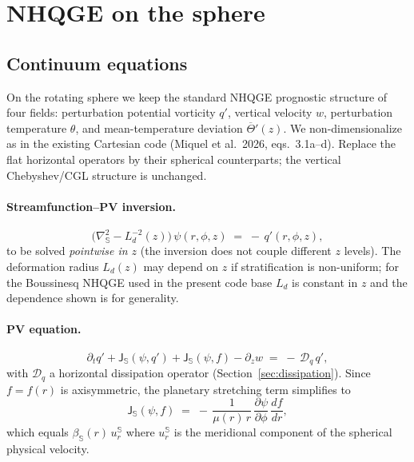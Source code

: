 \documentclass[11pt]{article}
\newcommand{\Lapsphere}{\nabla^2_{\!\mathbb{S}}}
\newcommand{\Jsphere}{\mathsf{J}_{\mathbb{S}}}
\newcommand{\Ld}{L_d}
\begin{document}
\section{NHQGE on the sphere}
\label{sec:nhqge}

\subsection{Continuum equations}

On the rotating sphere we keep the standard NHQGE prognostic structure
of four fields: perturbation potential vorticity $q'$, vertical
velocity $w$, perturbation temperature $\theta$, and mean-temperature
deviation $\overline{\Theta}'(z)$.  We non-dimensionalize as in the
existing Cartesian code (Miquel et al.~2026, eqs.~3.1a--d).  Replace
the flat horizontal operators by their spherical counterparts; the
vertical Chebyshev/CGL structure is unchanged.

\paragraph{Streamfunction--PV inversion.}
\begin{equation}
  \boxed{\;\;
  \bigl(\Lapsphere - \Ld^{-2}(z)\bigr)\,\psi(r,\phi,z)
  \;=\; -\,q'(r,\phi,z),
  \;\;}
  \label{eq:psi-q}
\end{equation}
to be solved \emph{pointwise in $z$} (the inversion does not couple
different $z$ levels).  The deformation radius $\Ld(z)$ may depend on
$z$ if stratification is non-uniform; for the Boussinesq NHQGE used
in the present code base $\Ld$ is constant in $z$ and the dependence
shown is for generality.

\paragraph{PV equation.}
\begin{equation}
  \partial_{t} q' + \Jsphere(\psi, q')
  + \Jsphere(\psi, f)
  - \partial_{z} w
  \;=\; -\,\mathcal{D}_{q}\,q',
  \label{eq:q-eq}
\end{equation}
with $\mathcal{D}_{q}$ a horizontal dissipation operator
(Section~\ref{sec:dissipation}).  Since $f = f(r)$ is axisymmetric, the
planetary stretching term simplifies to
\begin{equation}
  \Jsphere(\psi, f) \;=\; -\,\frac{1}{\mu(r)\,r}\,
  \frac{\partial \psi}{\partial \phi}\,\frac{df}{dr},
  \label{eq:Jpsi-f}
\end{equation}
which equals $\beta_{\mathbb{S}}(r)\,u_{r}^{\mathbb{S}}$ where
$u_{r}^{\mathbb{S}}$ is the meridional component of the spherical
physical velocity.
\end{document}
